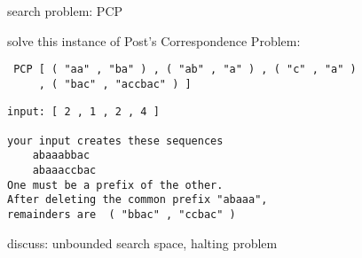 \begin{slide}{search problem: PCP}

solve this instance of Post's Correspondence Problem:
\begin{small}
\begin{verbatim}
 PCP [ ( "aa" , "ba" ) , ( "ab" , "a" ) , ( "c" , "a" )
     , ( "bac" , "accbac" ) ]
\end{verbatim}
  
\begin{verbatim}
input: [ 2 , 1 , 2 , 4 ]

your input creates these sequences
    abaaabbac
    abaaaccbac
One must be a prefix of the other.
After deleting the common prefix "abaaa",
remainders are  ( "bbac" , "ccbac" )
\end{verbatim}
\end{small}
discuss: unbounded search space, halting problem
\end{slide}
